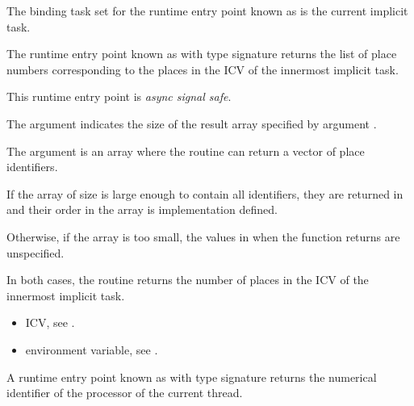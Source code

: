 \binding

The binding task set for
the runtime entry point known as 
is the current implicit task.

\descr

The runtime entry point known as
 with type signature
 returns the list of place
numbers corresponding to the places in the 
ICV of the innermost implicit task.

This runtime entry point is \emph{async signal safe}.

\argdesc

The argument  indicates the size of the result
array specified by argument .

The argument  is an array where the routine can return
a vector of place identifiers.

\effect

If the array  of size  is
large enough to contain all identifiers, they are returned in
 and their order in the array is implementation
defined.

Otherwise, if the  array is too small, the values in  when the function returns are unspecified.

In both cases, the routine returns the number of places in the
 ICV of the innermost implicit task.

\crossreferences
\begin{itemize}
\item {} ICV, see
.

\item {} environment variable, see
.

\end{itemize}





\label{sec:ompt_get_proc_id_t}
\label{sec:ompt_get_proc_id}

\summary

A runtime entry point known as
 with type signature
 returns the numerical identifier
of the processor of the current thread.

